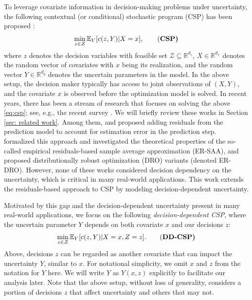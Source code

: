 \documentclass[onefignum,onetabnum]{siamart251216}
\begin{document}
To leverage covariate information in decision-making problems under uncertainty, the following contextual (or conditional) stochastic program (CSP) has been proposed \cite{ban2019big,bertsimas2020predictive,sen2018learning}:
\begin{equation}
    \label{eq:csp}
     \min_{z \in \mathcal{Z}} \mathbb{E}_Y[c(z,Y)|X=x],
     \tag{\bf{CSP}} \notag
\end{equation}
where $z$ denotes the decision variables with feasible set $\mathcal{Z} \subseteq \mathbb{R}^{d_z}$, $X \in \mathbb{R}^{d_x}$ denotes the random vector of covariates with $x$ being its realization, and the random vector $Y \in \mathbb{R}^{d_y}$ denotes the uncertain parameters in the model. In the above setup, the decision maker typically has access to joint observations of $(X,Y)$, and the covariate $x$ is observed before the optimization model is solved. 
In recent years, there has been a stream of research that focuses on solving the above \eqref{eq:csp}; see, e.g., the recent survey \cite{sadana2024survey}. We will briefly review these works in Section \ref{sec: related work}. Among them, \cite{ban2019dynamic} and \cite{sen2018learning} proposed adding residuals from the prediction model 
to account for estimation error in the prediction step. 
\cite{kannan2025data} formalized this approach and investigated the theoretical properties of the so-called empirical residuals-based sample average approximation (ER-SAA), and  \cite{kannan2020residuals}  proposed distributionally robust optimization (DRO) variants (denoted ER-DRO). However,  none of these works considered decision dependency on the uncertainty, which is critical in many real-world applications. 
This work extends the residuals-based approach to CSP by modeling decision-dependent uncertainty. 




Motivated by this gap and the decision-dependent uncertainty present in many real-world applications, 
we focus on the following {\it decision-dependent CSP}, where the uncertain parameter $Y$ depends on both covariate $x$ and our decisions $z$: 
\begin{equation}\label{eq:ddcsp}
   \min_{z \in \mathcal{Z}} \mathbb{E}_Y [c(z, Y)|X = x, Z =z].
   \tag{\bf{DD-CSP}}
\end{equation}
Above, decisions $z$ can be regarded as another covariate that can impact the uncertainty $Y$, similar to $x$. For notational simplicity, we omit $x$ and $z$ from the notation for $Y$  here. We will write $Y$ as $Y(x,z)$ explicitly to facilitate our analysis later.
Note that the above setup, without loss of generality, considers a portion of decisions $z$ that affect uncertainty and others that may not. 
\end{document}
